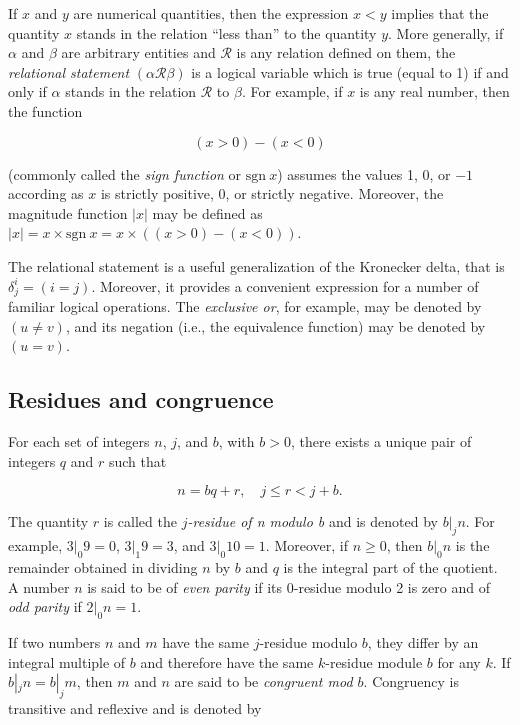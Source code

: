 \par If $x$ and $y$ are numerical quantities, then the expression $x < y$ implies that the quantity $x$ stands in the relation ``less than'' to the quantity $y$. More generally, if $α$ and $β$ are arbitrary entities and $\mathcal{R}$ is any relation defined on them, the \textit{relational statement} $(α \mathcal{R} β)$ is a logical variable which is true (equal to 1) if and only if $α$ stands in the relation $\mathcal{R}$ to $β$. For example, if $x$ is any real number, then the function

$$
  (x > 0) - (x < 0)
$$

\par (commonly called the \textit{sign function} or $\text{sgn}\ x$) assumes the values 1, 0, or $-1$ according as $x$ is strictly positive, 0, or strictly negative. Moreover, the magnitude function $|x|$ may be defined as $|x| = x \times \text{sgn}\ x = x \times ((x > 0) - (x < 0))$.

\par The relational statement is a useful generalization of the Kronecker delta, that is $δ_j^i = (i = j)$. Moreover, it provides a convenient expression for a number of familiar logical operations. The \textit{exclusive or}, for example, may be denoted by $(u \neq v)$, and its negation (i.e., the equivalence function) may be denoted by $(u = v)$.

\subsection*{Residues and congruence}

\par For each set of integers $n$, $j$, and $b$, with $b > 0$, there exists a unique pair of integers $q$ and $r$ such that

$$
  n = bq + r,\quad j \leq r < j + b.
$$

\par The quantity $r$ is called the \textit{$j$-residue of n modulo b} and is denoted by $b |_j n$. For example, $3 |_0 9 = 0$, $3 |_1 9 = 3$, and $3 |_0 10 = 1$. Moreover, if $n \geq 0$, then $b |_0 n$ is the remainder obtained in dividing $n$ by $b$ and $q$ is the integral part of the quotient. A number $n$ is said to be of \textit{even parity} if its 0-residue modulo 2 is zero and of \textit{odd parity} if $2 |_0 n = 1$.

\par If two numbers $n$ and $m$ have the same $j$-residue modulo $b$, they differ by an integral multiple of $b$ and therefore have the same $k$-residue module $b$ for any $k$. If $b |_j n = b |_j m$, then $m$ and $n$ are said to be \textit{congruent mod $b$}. Congruency is transitive and reflexive and is denoted by

